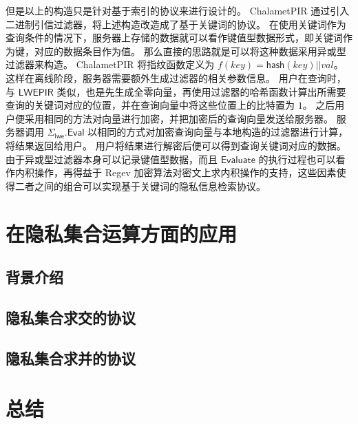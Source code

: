 但是以上的构造只是针对基于索引的协议来进行设计的。
ChalametPIR 通过引入二进制引信过滤器，将上述构造改造成了基于关键词的协议。
在使用关键词作为查询条件的情况下，服务器上存储的数据就可以看作键值型数据形式，即关键词作为键，对应的数据条目作为值。
那么直接的思路就是可以将这种数据采用异或型过滤器来构造。
ChalametPIR 将指纹函数定义为 $f(key) = \mathsf{hash}(key) || val$。
这样在离线阶段，服务器需要额外生成过滤器的相关参数信息。
用户在查询时，与 $\mathsf{LWEPIR}$ 类似，也是先生成全零向量，再使用过滤器的哈希函数计算出所需要查询的关键词对应的位置，并在查询向量中将这些位置上的比特置为 $1$。
之后用户便采用相同的方法对向量进行加密，并把加密后的查询向量发送给服务器。
服务器调用 $\Sigma_{\mathsf{lwe}}.\mathsf{Eval}$ 以相同的方式对加密查询向量与本地构造的过滤器进行计算，将结果返回给用户。
用户将结果进行解密后便可以得到查询关键词对应的数据。
由于异或型过滤器本身可以记录键值型数据，而且 $\mathsf{Evaluate}$ 的执行过程也可以看作内积操作，再得益于 Regev 加密算法对密文上求内积操作的支持，这些因素使得二者之间的组合可以实现基于关键词的隐私信息检索协议。


\section{在隐私集合运算方面的应用}

\subsection{背景介绍}

\subsection{隐私集合求交的协议}

\subsection{隐私集合求并的协议}

\section{总结}
